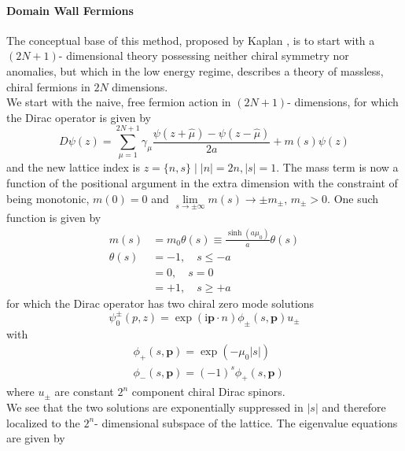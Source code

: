 \documentclass[a4paper,10pt]{article}
\begin{document}
\paragraph{Domain Wall Fermions}
The conceptual base of this method, proposed by Kaplan \cite{KaplanDavidB1992Amfs}, is to start with a $(2N+1)$- dimensional theory possessing neither chiral symmetry nor anomalies, but which in the low energy regime, describes a theory of massless, chiral fermions in $2N$ dimensions.\\We start with the naive, free fermion action in $(2N+1)$- dimensions, for which the Dirac operator is given by
\begin{equation}
D\psi(z)=\sum_{\mu=1}^{2N+1} \gamma_{\mu} \frac{\psi(z+\hat{\mu})- \psi(z-\hat{\mu})}{2 a}+m(s) \psi(z)
\end{equation}
and the new lattice index is $z = \{n,s\}\mid |n| =2n, |s|=1$. The mass term is now a function of the positional argument in the extra dimension with the constraint of being monotonic, $m(0)=0$ and $\lim\limits_{s \to \pm \infty}m(s)\rightarrow \pm m_\pm,\,m_\pm > 0$. One such function is given by
\begin{equation}
\begin{aligned}
m(s) &=m_{0} \theta(s) \equiv \frac{\sinh \left(a \mu_{0}\right)}{a} \theta(s) \\
\theta(s) &=-1, \quad s \leq-a \\
&=0, \quad s=0 \\
&=+1, \quad s \geq+a
\end{aligned}
\end{equation}
for which the Dirac operator has two chiral zero mode solutions
\begin{equation}
\psi_{0}^{\pm}(p, z)=\exp (\mathrm{i} \boldsymbol{p} \cdot n) \phi_{\pm}(s, \boldsymbol{p}) u_{\pm}
\end{equation}
with
\begin{equation}
\begin{aligned}
&\phi_{+}(s, \boldsymbol{p})=\exp \left(-\mu_{0}|s|\right) \\
&\phi_{-}(s, \boldsymbol{p})=(-1)^{s} \phi_{+}(s, \boldsymbol{p})
\end{aligned}
\end{equation}
where $u_\pm$ are constant $2^n$ component chiral Dirac spinors.\\We see that the two solutions are exponentially suppressed in $|s|$ and therefore localized to the $2^n$- dimensional subspace of the lattice. The eigenvalue equations are given by
\end{document}
